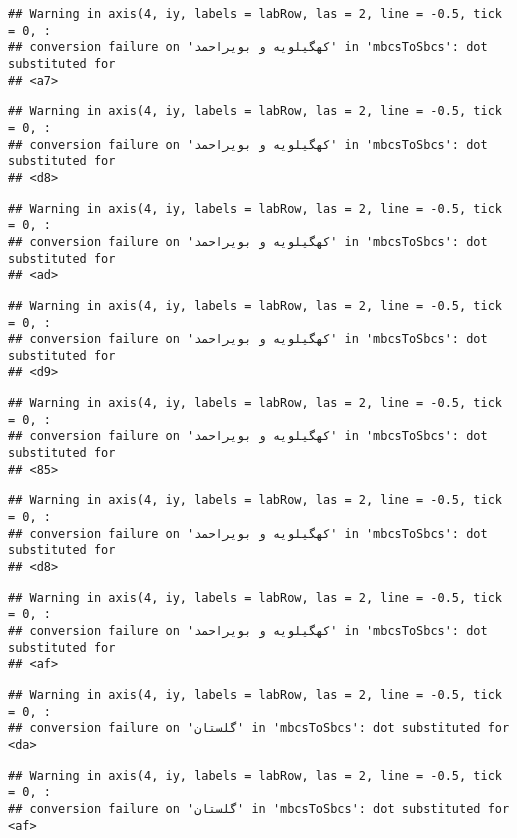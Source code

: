 \documentclass[
]{article}
\begin{document}
\begin{verbatim}
## Warning in axis(4, iy, labels = labRow, las = 2, line = -0.5, tick = 0, :
## conversion failure on 'کهگیلویه و بویراحمد' in 'mbcsToSbcs': dot substituted for
## <a7>
\end{verbatim}

\begin{verbatim}
## Warning in axis(4, iy, labels = labRow, las = 2, line = -0.5, tick = 0, :
## conversion failure on 'کهگیلویه و بویراحمد' in 'mbcsToSbcs': dot substituted for
## <d8>
\end{verbatim}

\begin{verbatim}
## Warning in axis(4, iy, labels = labRow, las = 2, line = -0.5, tick = 0, :
## conversion failure on 'کهگیلویه و بویراحمد' in 'mbcsToSbcs': dot substituted for
## <ad>
\end{verbatim}

\begin{verbatim}
## Warning in axis(4, iy, labels = labRow, las = 2, line = -0.5, tick = 0, :
## conversion failure on 'کهگیلویه و بویراحمد' in 'mbcsToSbcs': dot substituted for
## <d9>
\end{verbatim}

\begin{verbatim}
## Warning in axis(4, iy, labels = labRow, las = 2, line = -0.5, tick = 0, :
## conversion failure on 'کهگیلویه و بویراحمد' in 'mbcsToSbcs': dot substituted for
## <85>
\end{verbatim}

\begin{verbatim}
## Warning in axis(4, iy, labels = labRow, las = 2, line = -0.5, tick = 0, :
## conversion failure on 'کهگیلویه و بویراحمد' in 'mbcsToSbcs': dot substituted for
## <d8>
\end{verbatim}

\begin{verbatim}
## Warning in axis(4, iy, labels = labRow, las = 2, line = -0.5, tick = 0, :
## conversion failure on 'کهگیلویه و بویراحمد' in 'mbcsToSbcs': dot substituted for
## <af>
\end{verbatim}

\begin{verbatim}
## Warning in axis(4, iy, labels = labRow, las = 2, line = -0.5, tick = 0, :
## conversion failure on 'گلستان' in 'mbcsToSbcs': dot substituted for <da>
\end{verbatim}

\begin{verbatim}
## Warning in axis(4, iy, labels = labRow, las = 2, line = -0.5, tick = 0, :
## conversion failure on 'گلستان' in 'mbcsToSbcs': dot substituted for <af>
\end{verbatim}
\end{document}
